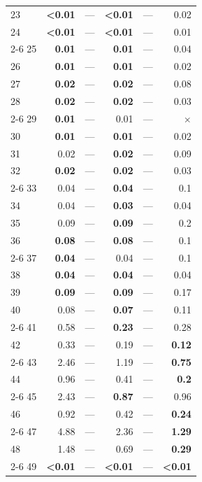 \begin{longtable}{lr@{\hskip 4pt}l@{\hskip 12pt}r@{\hskip 4pt}l@{\hskip 12pt}r}
23 & \textbf{<0.01} & --- & \textbf{<0.01} & --- & 0.02 \\
24 & \textbf{<0.01} & --- & \textbf{<0.01} & --- & 0.01 \\
\cmidrule{2-6}
25 & \textbf{0.01} & --- & \textbf{0.01} & --- & 0.04 \\
26 & \textbf{0.01} & --- & \textbf{0.01} & --- & 0.02 \\
27 & \textbf{0.02} & --- & \textbf{0.02} & --- & 0.08 \\
28 & \textbf{0.02} & --- & \textbf{0.02} & --- & 0.03 \\
\cmidrule{2-6}
29 & \textbf{0.01} & --- & 0.01 & --- & $\times$ \\
30 & \textbf{0.01} & --- & \textbf{0.01} & --- & 0.02 \\
31 & 0.02 & --- & \textbf{0.02} & --- & 0.09 \\
32 & \textbf{0.02} & --- & \textbf{0.02} & --- & 0.03 \\
\cmidrule{2-6}
33 & 0.04 & --- & \textbf{0.04} & --- & 0.1 \\
34 & 0.04 & --- & \textbf{0.03} & --- & 0.04 \\
35 & 0.09 & --- & \textbf{0.09} & --- & 0.2 \\
36 & \textbf{0.08} & --- & \textbf{0.08} & --- & 0.1 \\
\cmidrule{2-6}
37 & \textbf{0.04} & --- & 0.04 & --- & 0.1 \\
38 & \textbf{0.04} & --- & \textbf{0.04} & --- & 0.04 \\
39 & \textbf{0.09} & --- & \textbf{0.09} & --- & 0.17 \\
40 & 0.08 & --- & \textbf{0.07} & --- & 0.11 \\
\cmidrule{2-6}
41 & 0.58 & --- & \textbf{0.23} & --- & 0.28 \\
42 & 0.33 & --- & 0.19 & --- & \textbf{0.12} \\
\cmidrule{2-6}
43 & 2.46 & --- & 1.19 & --- & \textbf{0.75} \\
44 & 0.96 & --- & 0.41 & --- & \textbf{0.2} \\
\cmidrule{2-6}
45 & 2.43 & --- & \textbf{0.87} & --- & 0.96 \\
46 & 0.92 & --- & 0.42 & --- & \textbf{0.24} \\
\cmidrule{2-6}
47 & 4.88 & --- & 2.36 & --- & \textbf{1.29} \\
48 & 1.48 & --- & 0.69 & --- & \textbf{0.29} \\
\cmidrule{2-6}
49 & \textbf{<0.01} & --- & \textbf{<0.01} & --- & \textbf{<0.01} \\

\end{longtable}

